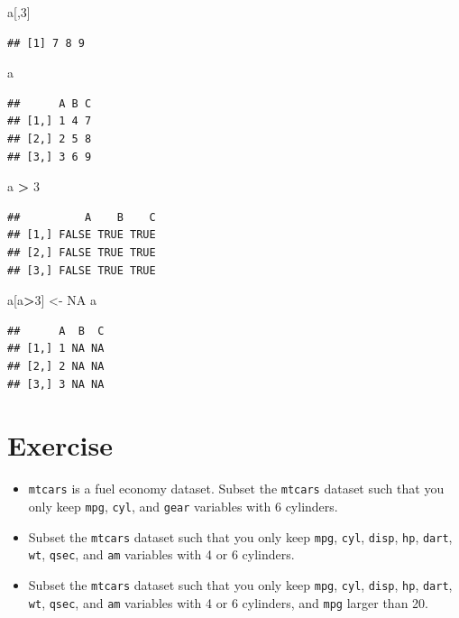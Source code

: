 \documentclass[]{book}
\newenvironment{Shaded}{\begin{snugshade}}{\end{snugshade}}
\newcommand{\DecValTok}[1]{\textcolor[rgb]{0.00,0.00,0.81}{#1}}
\newcommand{\NormalTok}[1]{#1}
\newcommand{\OperatorTok}[1]{\textcolor[rgb]{0.81,0.36,0.00}{\textbf{#1}}}
\newcommand{\OtherTok}[1]{\textcolor[rgb]{0.56,0.35,0.01}{#1}}
\newcommand{\StringTok}[1]{\textcolor[rgb]{0.31,0.60,0.02}{#1}}
\begin{document}
\begin{Shaded}
\begin{Highlighting}[]
\NormalTok{a[,}\DecValTok{3}\NormalTok{]}
\end{Highlighting}
\end{Shaded}

\begin{verbatim}
## [1] 7 8 9
\end{verbatim}

\begin{Shaded}
\begin{Highlighting}[]
\NormalTok{a}
\end{Highlighting}
\end{Shaded}

\begin{verbatim}
##      A B C
## [1,] 1 4 7
## [2,] 2 5 8
## [3,] 3 6 9
\end{verbatim}

\begin{Shaded}
\begin{Highlighting}[]
\NormalTok{a }\OperatorTok{>}\StringTok{ }\DecValTok{3}
\end{Highlighting}
\end{Shaded}

\begin{verbatim}
##          A    B    C
## [1,] FALSE TRUE TRUE
## [2,] FALSE TRUE TRUE
## [3,] FALSE TRUE TRUE
\end{verbatim}

\begin{Shaded}
\begin{Highlighting}[]
\NormalTok{a[a}\OperatorTok{>}\DecValTok{3}\NormalTok{] <-}\StringTok{ }\OtherTok{NA}
\NormalTok{a}
\end{Highlighting}
\end{Shaded}

\begin{verbatim}
##      A  B  C
## [1,] 1 NA NA
## [2,] 2 NA NA
## [3,] 3 NA NA
\end{verbatim}

\hypertarget{exercise-4}{%
\section{Exercise}\label{exercise-4}}

\begin{itemize}
\item
  \texttt{mtcars} is a fuel economy dataset. Subset the \texttt{mtcars} dataset such that you only keep \texttt{mpg}, \texttt{cyl}, and \texttt{gear} variables with 6 cylinders.
\item
  Subset the \texttt{mtcars} dataset such that you only keep \texttt{mpg}, \texttt{cyl}, \texttt{disp}, \texttt{hp}, \texttt{dart}, \texttt{wt}, \texttt{qsec}, and \texttt{am} variables with 4 or 6 cylinders.
\item
  Subset the \texttt{mtcars} dataset such that you only keep \texttt{mpg}, \texttt{cyl}, \texttt{disp}, \texttt{hp}, \texttt{dart}, \texttt{wt}, \texttt{qsec}, and \texttt{am} variables with 4 or 6 cylinders, and \texttt{mpg} larger than 20.
\end{itemize}
\end{document}
